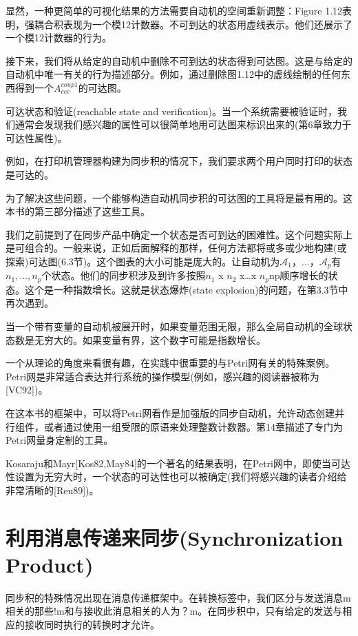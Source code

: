 \documentclass{book}
\begin{document}
    
    显然，一种更简单的可视化结果的方法需要自动机的空间重新调整：Figure 1.12表明，强耦合积表现为一个模12计数器。不可到达的状态用虚线表示。他们还展示了一个模12计数器的行为。
    
    接下来，我们将从给定的自动机中删除不可到达的状态得到可达图。这是与给定的自动机中唯一有关的行为描述部分。例如，通过删除图1.12中的虚线绘制的任何东西得到一个$A_{ccc}^{coup1}$的可达图。

    可达状态和验证(reachable state and verification)。当一个系统需要被验证时，我们通常会发现我们感兴趣的属性可以很简单地用可达图来标识出来的(第6章致力于可达性属性)。
   
    例如，在打印机管理器构建为同步积的情况下，我们要求两个用户同时打印的状态是可达的。
    
    为了解决这些问题，一个能够构造自动机同步积的可达图的工具将是最有用的。这本书的第三部分描述了这些工具。
    
    我们之前提到了在同步产品中确定一个状态是否可到达的困难性。这个问题实际上是可组合的。一般来说，正如后面解释的那样，任何方法都将或多或少地构建(或探索)可达图(6.3节)。这个图表的大小可能是庞大的。让自动机为$\mathcal{A}_1，…，\mathcal{A}_p$有$n_1,…,n_p$个状态。他们的同步积涉及到许多按照$n_1$ x $n_2$ x…x $n_p$np顺序增长的状态。这个是一种指数增长。这就是状态爆炸(state explosion)的问题，在第3.3节中再次遇到。
    
    当一个带有变量的自动机被展开时，如果变量范围无限，那么全局自动机的全球状态数是无穷大的。如果变量有界，这个数字可能是指数增长。
    
    一个从理论的角度来看很有趣，在实践中很重要的与Petri网有关的特殊案例。Petri网是非常适合表达并行系统的操作模型(例如，感兴趣的阅读器被称为[VC92])。
    
    在这本书的框架中，可以将Petri网看作是加强版的同步自动机，允许动态创建并行组件，或者通过使用一组受限的原语来处理整数计数器。第14章描述了专门为Petri网量身定制的工具。
    
    Kosaraju和Mayr[Kos82,May84]的一个著名的结果表明，在Petri网中，即使当可达性设置为无穷大时，一个状态的可达性也可以被确定(我们将感兴趣的读者介绍给非常清晰的[Reu89])。

    \section{利用消息传递来同步(Synchronization Product)}
    同步积的特殊情况出现在消息传递框架中。在转换标签中，我们区分与发送消息m相关的那些!m和与接收此消息相关的人为？m。在同步积中，只有给定的发送与相应的接收同时执行的转换时才允许。
    
\end{document}
